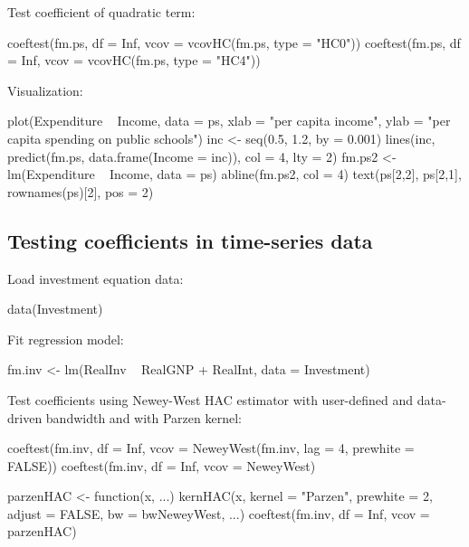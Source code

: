 \documentclass{Z}
\begin{document}
\begin{appendix}
Test coefficient of quadratic term:
\begin{Schunk}
\begin{Sinput}
  coeftest(fm.ps, df = Inf, vcov = vcovHC(fm.ps, type = "HC0"))
  coeftest(fm.ps, df = Inf, vcov = vcovHC(fm.ps, type = "HC4"))
\end{Sinput}
\end{Schunk}

Visualization: %
\begin{Schunk}
\begin{Sinput}
  plot(Expenditure ~ Income, data = ps,
    xlab = "per capita income",
    ylab = "per capita spending on public schools")
  inc <- seq(0.5, 1.2, by = 0.001)
  lines(inc, predict(fm.ps, data.frame(Income = inc)), col = 4, lty = 2)
  fm.ps2 <- lm(Expenditure ~ Income, data = ps)
  abline(fm.ps2, col = 4)
  text(ps[2,2], ps[2,1], rownames(ps)[2], pos = 2)
\end{Sinput}
\end{Schunk}

\subsection{Testing coefficients in time-series data}

Load investment equation data:
\begin{Schunk}
\begin{Sinput}
  data(Investment)
\end{Sinput}
\end{Schunk}

Fit regression model:
\begin{Schunk}
\begin{Sinput}
  fm.inv <- lm(RealInv ~ RealGNP + RealInt, data = Investment)
\end{Sinput}
\end{Schunk}

Test coefficients using Newey-West HAC estimator with user-defined and data-driven bandwidth
and with Parzen kernel:
\begin{Schunk}
\begin{Sinput}
  coeftest(fm.inv, df = Inf, vcov = NeweyWest(fm.inv, lag = 4, prewhite = FALSE))
  coeftest(fm.inv, df = Inf, vcov = NeweyWest)

  parzenHAC <- function(x, ...) kernHAC(x, kernel = "Parzen", prewhite = 2,
    adjust = FALSE, bw = bwNeweyWest, ...)
  coeftest(fm.inv, df = Inf, vcov = parzenHAC)
\end{Sinput}
\end{Schunk}


\end{appendix}
\end{document}
